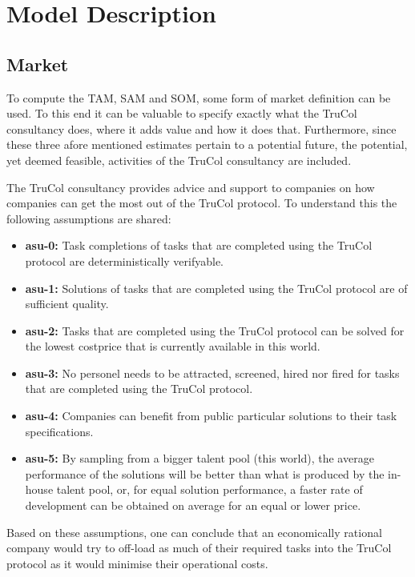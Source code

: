 \section{Model Description}\label{sec:model_description}


\subsection{Market}\label{subsec:model_description_market}
To compute the TAM, SAM and SOM, some form of market definition can be used. To this end it can be valuable to specify exactly what the TruCol consultancy does, where it adds value and how it does that. Furthermore, since these three afore mentioned estimates pertain to a potential future, the potential, yet deemed feasible, activities of the TruCol consultancy are included.

The TruCol consultancy provides advice and support to companies on how companies can get the most out of the TruCol protocol. To understand this the following assumptions are shared:

\begin{itemize}
	\item \textbf{asu-0:} Task completions of tasks that are completed using the TruCol protocol are deterministically verifyable.
	\item \textbf{asu-1:} Solutions of tasks that are completed using the TruCol protocol are of sufficient quality.
	\item \textbf{asu-2:} Tasks that are completed using the TruCol protocol can be solved for the lowest costprice that is currently available in this world.
	\item \textbf{asu-3:} No personel needs to be attracted, screened, hired nor fired for tasks that are completed using the TruCol protocol.
	\item \textbf{asu-4:} Companies can benefit from public particular solutions to their task specifications. 
	\item \textbf{asu-5:} By sampling from a bigger talent pool (this world), the average performance of the solutions will be better than what is produced by the in-house talent pool, or, for equal solution performance, a faster rate of development can be obtained on average for an equal or lower price.
\end{itemize}

Based on these assumptions, one can conclude that an economically rational company would try to off-load as much of their required tasks into the TruCol protocol as it would minimise their operational costs. 

